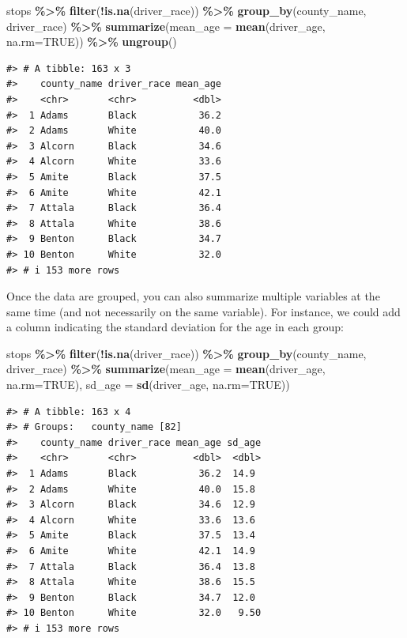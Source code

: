 \documentclass[
]{book}
\newenvironment{Shaded}{\begin{snugshade}}{\end{snugshade}}
\newcommand{\AttributeTok}[1]{\textcolor[rgb]{0.13,0.29,0.53}{#1}}
\newcommand{\ConstantTok}[1]{\textcolor[rgb]{0.56,0.35,0.01}{#1}}
\newcommand{\FunctionTok}[1]{\textcolor[rgb]{0.13,0.29,0.53}{\textbf{#1}}}
\newcommand{\NormalTok}[1]{#1}
\newcommand{\SpecialCharTok}[1]{\textcolor[rgb]{0.81,0.36,0.00}{\textbf{#1}}}
\begin{document}
\begin{Shaded}
\begin{Highlighting}[]
\NormalTok{stops }\SpecialCharTok{\%\textgreater{}\%} 
  \FunctionTok{filter}\NormalTok{(}\SpecialCharTok{!}\FunctionTok{is.na}\NormalTok{(driver\_race)) }\SpecialCharTok{\%\textgreater{}\%}
  \FunctionTok{group\_by}\NormalTok{(county\_name, driver\_race) }\SpecialCharTok{\%\textgreater{}\%}
  \FunctionTok{summarize}\NormalTok{(}\AttributeTok{mean\_age =} \FunctionTok{mean}\NormalTok{(driver\_age, }\AttributeTok{na.rm=}\ConstantTok{TRUE}\NormalTok{)) }\SpecialCharTok{\%\textgreater{}\%} 
  \FunctionTok{ungroup}\NormalTok{()}
\end{Highlighting}
\end{Shaded}

\begin{verbatim}
#> # A tibble: 163 x 3
#>    county_name driver_race mean_age
#>    <chr>       <chr>          <dbl>
#>  1 Adams       Black           36.2
#>  2 Adams       White           40.0
#>  3 Alcorn      Black           34.6
#>  4 Alcorn      White           33.6
#>  5 Amite       Black           37.5
#>  6 Amite       White           42.1
#>  7 Attala      Black           36.4
#>  8 Attala      White           38.6
#>  9 Benton      Black           34.7
#> 10 Benton      White           32.0
#> # i 153 more rows
\end{verbatim}

Once the data are grouped, you can also summarize multiple variables at the same
time (and not necessarily on the same variable). For instance, we could add a
column indicating the standard deviation for the age in each group:

\begin{Shaded}
\begin{Highlighting}[]
\NormalTok{stops }\SpecialCharTok{\%\textgreater{}\%}
  \FunctionTok{filter}\NormalTok{(}\SpecialCharTok{!}\FunctionTok{is.na}\NormalTok{(driver\_race)) }\SpecialCharTok{\%\textgreater{}\%} 
  \FunctionTok{group\_by}\NormalTok{(county\_name, driver\_race) }\SpecialCharTok{\%\textgreater{}\%}
  \FunctionTok{summarize}\NormalTok{(}\AttributeTok{mean\_age =} \FunctionTok{mean}\NormalTok{(driver\_age, }\AttributeTok{na.rm=}\ConstantTok{TRUE}\NormalTok{),}
            \AttributeTok{sd\_age =} \FunctionTok{sd}\NormalTok{(driver\_age, }\AttributeTok{na.rm=}\ConstantTok{TRUE}\NormalTok{))}
\end{Highlighting}
\end{Shaded}

\begin{verbatim}
#> # A tibble: 163 x 4
#> # Groups:   county_name [82]
#>    county_name driver_race mean_age sd_age
#>    <chr>       <chr>          <dbl>  <dbl>
#>  1 Adams       Black           36.2  14.9 
#>  2 Adams       White           40.0  15.8 
#>  3 Alcorn      Black           34.6  12.9 
#>  4 Alcorn      White           33.6  13.6 
#>  5 Amite       Black           37.5  13.4 
#>  6 Amite       White           42.1  14.9 
#>  7 Attala      Black           36.4  13.8 
#>  8 Attala      White           38.6  15.5 
#>  9 Benton      Black           34.7  12.0 
#> 10 Benton      White           32.0   9.50
#> # i 153 more rows
\end{verbatim}
\end{document}

